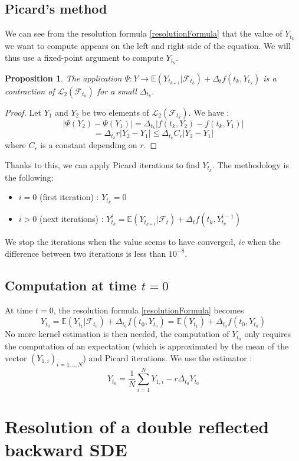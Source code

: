 \documentclass[a4paper,11pt,english]{book}
\newtheorem{prop}{Proposition}
\begin{document}
\subsection{Picard's method}
We can see from the resolution formula \eqref{resolutionFormula} that the value of $Y_{t_{k}}$ we want to compute appears on the left and right side of the equation. We will thus use a fixed-point argument to compute $Y_{t_{k}}$.

\begin{prop}
The application $\Psi : Y \rightarrow \mathbb{E}(Y_{t_{k+1}}|\mathcal{F}_{t_{k}}) + \Delta_{t}f(t_{k},Y_{t_{k}})$ is a contraction of $\mathcal{L}_{2}(\mathcal{F}_{t_{k}})$ for a small $\Delta_{t_{k}}$.
\end{prop}

\begin{proof}
Let $Y_{1}$ and $Y_{2}$ be two elements of $\mathcal{L}_{2}(\mathcal{F}_{t_{k}})$. We have : $$|\Psi(Y_{2})-\Psi(Y_{1})|=\Delta_{t_{k}}|f(t_{k},Y_{2})-f(t_{k},Y_{1})|$$
$$=\Delta_{t_{k}}r |Y_{2}-Y_{1}|\leq \Delta_{t_{k}} C_{r}|Y_{2}-Y_{1}|$$
where $C_{r}$ is a constant depending on $r$.
\end{proof}
Thanks to this, we can apply Picard iterations to find $Y_{t_{k}}$. The methodology is the following:
\begin{itemize}
    \item $i=0$ (first iteration) : $Y_{t_{k}}=0$
    \item $i>0$ (next iterations) : $Y_{t_{k}}^{i}=\mathbb{E}(Y_{t_{k+1}}|\mathcal{F}_{t}) + \Delta_{t}f(t_{k},Y_{t_{k}}^{i-1})$
\end{itemize}
We stop the iterations when the value seems to have converged, \textit{ie} when the difference between two iterations is less than $10^{-8}$.
\subsection{Computation at time $t=0$}
\label{subsec:computation-0}
At time $t=0$, the resolution formula \eqref{resolutionFormula} becomes $$Y_{t_{0}} = \mathbb{E}(Y_{t_{1}}|\mathcal{F}_{t_{0}}) + \Delta_{t_{0}}f(t_{0},Y_{t_{0}})=\mathbb{E}(Y_{t_{1}}) + \Delta_{t_{0}}f(t_{0},Y_{t_{0}})$$
No more kernel estimation is then needed, the computation of $Y_{t_{0}}$ only requires the computation of an expectation (which is approximated by the mean of the vector $(Y_{1,i})_{i=1,..,N}$) and Picard iterations. We use the estimator :
$$Y_{t_{0}} = \frac{1}{N}\sum_{i=1}^{N}Y_{1,i}-r\Delta_{t_{0}}Y_{t_{0}}$$
\section{Resolution of a double reflected backward SDE}
\end{document}
